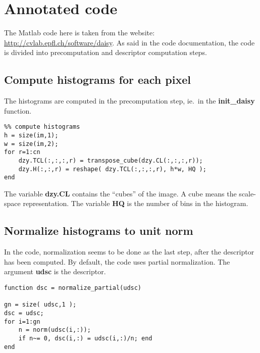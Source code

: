 
\section{Annotated code}

The Matlab code here is taken from the website: \url{http://cvlab.epfl.ch/software/daisy}.
As said in the code documentation, the code is divided into precomputation and
descriptor computation steps.

\subsection{Compute histograms for each pixel}

The histograms are computed in the precomputation step, ie.\ in the
\textbf{init\_daisy} function.

\begin{lstlisting}
%% compute histograms
h = size(im,1);
w = size(im,2);
for r=1:cn
    dzy.TCL(:,:,:,r) = transpose_cube(dzy.CL(:,:,:,r));
    dzy.H(:,:,r) = reshape( dzy.TCL(:,:,:,r), h*w, HQ );
end
\end{lstlisting}

The variable \textbf{dzy.CL} contains the ``cubes'' of the image. A cube means
the scale-space representation. The variable \textbf{HQ} is the number of bins
in the histogram.

\subsection{Normalize histograms to unit norm}

In the code, normalization seems to be done as the last step, after the
descriptor has been computed.
By default, the code uses partial normalization. The argument \textbf{udsc} is
the descriptor.
\begin{lstlisting}
function dsc = normalize_partial(udsc)

gn = size( udsc,1 );
dsc = udsc;
for i=1:gn
    n = norm(udsc(i,:));
    if n~= 0, dsc(i,:) = udsc(i,:)/n; end
end
\end{lstlisting}

